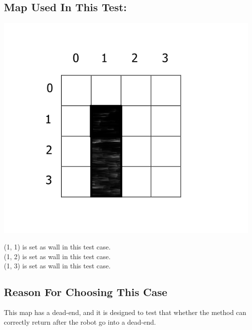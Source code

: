\documentclass[11pt, a4paper]{report}
\begin{document}
\subsection{Map Used In This Test:}
\begin{center}
\includegraphics[scale=0.4]{./image/Test3.png}
\end{center}

\noindent (1, 1) is set as wall in this test case.\\
(1, 2) is set as wall in this test case.\\
(1, 3) is set as wall in this test case.\\

\subsection{Reason For Choosing This Case}
This map has a dead-end, and it is designed to test that whether the method can correctly return after the robot go into a dead-end.
\end{document}
